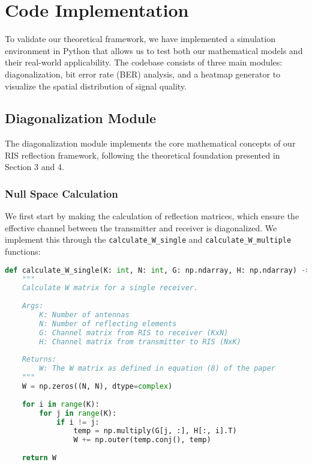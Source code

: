 \section{Code Implementation}

To validate our theoretical framework, we have implemented a simulation environment in Python that allows us to test both our mathematical models and their real-world applicability. The codebase consists of three main modules: diagonalization, bit error rate (BER) analysis, and a heatmap generator to visualize the spatial distribution of signal quality.

\subsection{Diagonalization Module}

The diagonalization module implements the core mathematical concepts of our RIS reflection framework, following the theoretical foundation presented in Section 3 and 4.

\subsubsection{Null Space Calculation}
We first start by making the calculation of reflection matrices, which ensure the effective channel between the transmitter and receiver is diagonalized. We implement this through the \texttt{calculate\_W\_single} and \texttt{calculate\_W\_multiple} functions:

\begin{lstlisting}[language=python, caption={Calculation of W matrices}]
def calculate_W_single(K: int, N: int, G: np.ndarray, H: np.ndarray) -> np.ndarray:
    """
    Calculate W matrix for a single receiver.
    
    Args:
        K: Number of antennas
        N: Number of reflecting elements
        G: Channel matrix from RIS to receiver (KxN)
        H: Channel matrix from transmitter to RIS (NxK)
    
    Returns:
        W: The W matrix as defined in equation (8) of the paper
    """
    W = np.zeros((N, N), dtype=complex)
    
    for i in range(K):
        for j in range(K):
            if i != j:
                temp = np.multiply(G[j, :], H[:, i].T)
                W += np.outer(temp.conj(), temp)
    
    return W
\end{lstlisting}

